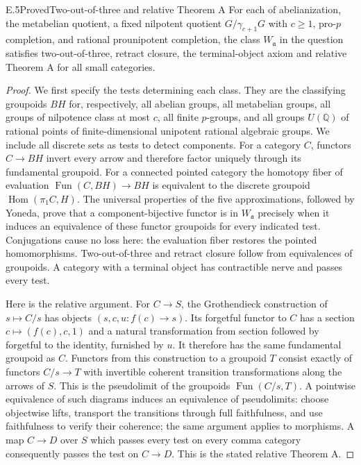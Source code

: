 \begin{statement}{E.5}{Proved}{Two-out-of-three and relative Theorem A}
For each of abelianization, the metabelian quotient, a fixed
nilpotent quotient $G/\gamma_{c+1}G$ with $c\geq1$, pro-$p$
completion, and rational prounipotent completion, the class
$W_{\mathfrak a}$ in the question satisfies two-out-of-three,
retract closure, the terminal-object axiom and relative Theorem A
for all small categories.
\end{statement}
\begin{proof}
We first specify the tests determining each class. They are the
classifying groupoids $BH$ for, respectively, all abelian groups,
all metabelian groups, all groups of nilpotence class at most $c$,
all finite $p$-groups, and all groups $U(\mathbb Q)$ of rational
points of finite-dimensional unipotent rational algebraic groups.
We include all discrete sets as tests to detect components.
For a category $C$, functors $C\to BH$ invert every arrow and
therefore factor uniquely through its fundamental groupoid.
For a connected pointed category the homotopy fiber of evaluation
$\operatorname{Fun}(C,BH)\to BH$ is equivalent to the discrete groupoid
$\operatorname{Hom}(\pi_1C,H)$. The universal properties of the five
approximations, followed by Yoneda, prove that a component-bijective
functor is in $W_{\mathfrak a}$ precisely when it induces an
equivalence of these functor groupoids for every indicated test.
Conjugations cause no loss here: the evaluation fiber restores the
pointed homomorphisms. Two-out-of-three and retract closure follow
from equivalences of groupoids. A category with a terminal object
has contractible nerve and passes every test.

Here is the relative argument. For $C\to S$, the Grothendieck
construction of $s\mapsto C/s$ has objects
$(s,c,u:f(c)\to s)$. Its forgetful functor to $C$ has a section
$c\mapsto(f(c),c,1)$ and a natural transformation from section
followed by forgetful to the identity, furnished by $u$.
It therefore has the same fundamental groupoid as $C$.
Functors from this construction to a groupoid $T$ consist exactly
of functors $C/s\to T$ with invertible coherent transition
transformations along the arrows of $S$. This is the pseudolimit
of the groupoids $\operatorname{Fun}(C/s,T)$. A pointwise
equivalence of such diagrams induces an equivalence of pseudolimits:
choose objectwise lifts, transport the transitions through full
faithfulness, and use faithfulness to verify their coherence;
the same argument applies to morphisms. A map $C\to D$ over $S$
which passes every test on every comma category consequently passes
the test on $C\to D$. This is the stated relative Theorem A.
\end{proof}

